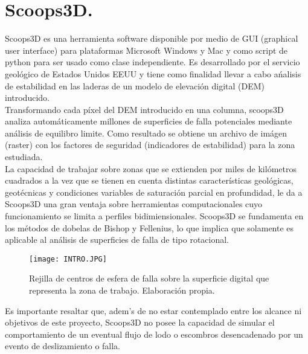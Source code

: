 \chapter{Scoops3D.}
Scoops3D es una herramienta software disponible por medio de GUI (graphical user interface) para plataformas Microsoft Windows y Mac  y como script de python para ser usado como clase independiente. Es desarrollado por el servicio geol\'ogico de Estados Unidos EEUU y tiene como finalidad llevar a cabo a\'nalisis de estabilidad en las laderas de un modelo de elevaci\'on digital (DEM) introducido.\\

Transformando cada p\'ixel del DEM introducido en una columna, scoops3D analiza autom\'aticamente millones de superficies de falla potenciales mediante an\'alisis de equilibro limite.  Como resultado se obtiene un archivo de im\'agen (raster) con los factores de seguridad (indicadores de estabilidad) para la zona estudiada.\\

La capacidad de trabajar sobre zonas que se extienden por miles de kil\'ometros cuadrados a la vez que se tienen en cuenta distintas caracter\'isticas geol\'ogicas, geot\'ecnicas y condiciones variables de saturaci\'on parcial en profundidad, le da a Scoops3D una gran ventaja sobre herramientas computacionales cuyo funcionamiento se limita a perfiles bidimiensionales.
Scoops3D se fundamenta en los m\'etodos de dobelas de Bishop y Fellenius, lo que implica que solamente es aplicable al an\'alisis de superficies de falla de tipo rotacional.

\begin{figure}[H]
\centering
\texttt{[image: INTRO.JPG]}
\caption{Rejilla de centros de esfera de falla sobre la superficie digital que representa la zona de trabajo. Elaboraci\'on propia.}
\end{figure}
Es importante resaltar que, adem\a's de no estar contemplado entre los alcance ni objetivos de este proyecto, Scoops3D no posee la capacidad de simular el comportamiento de un eventual flujo de lodo o escombros desencadenado por un evento de deslizamiento o falla. 